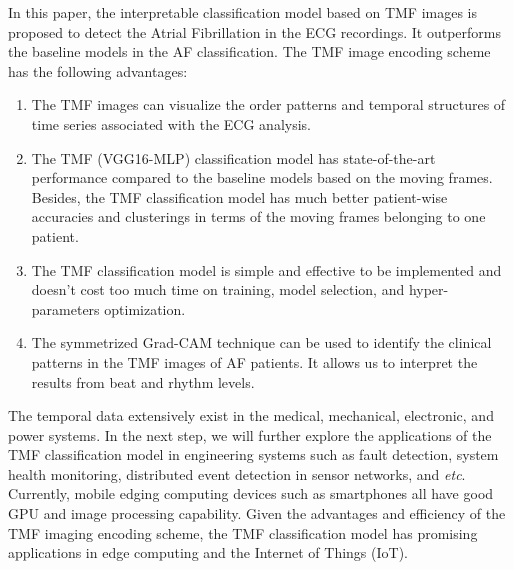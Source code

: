 \documentclass[journal]{IEEEtran}
\begin{document}
In this paper, the interpretable classification model based on TMF images is proposed to detect the Atrial Fibrillation in the ECG recordings. 
It outperforms the baseline models in the AF classification. The TMF image encoding scheme has the following advantages:
\begin{enumerate}
  \item The TMF images can visualize the order patterns and temporal structures of time series associated with the ECG analysis.
  \item The TMF (VGG16-MLP) classification model has state-of-the-art performance compared to the baseline models based on the moving frames. Besides, the TMF classification model has much better patient-wise accuracies and clusterings in terms of the moving frames belonging to one patient.  
  \item The TMF classification model is simple and effective to be implemented and doesn't cost too much time on training, model selection, and hyper-parameters optimization.
  \item The symmetrized Grad-CAM technique can be used to identify the clinical patterns in the TMF images of AF patients. It allows us to interpret the results from beat and rhythm levels. 
\end{enumerate}
The temporal data extensively exist in the medical, mechanical, electronic, and power systems. In the next step, we will further explore the applications of the TMF classification model in engineering systems such as fault detection, system health monitoring, distributed event detection in sensor networks, and {\it{etc}}. Currently, mobile edging computing devices such as smartphones all have good GPU and image processing capability. Given the advantages and efficiency of the TMF imaging encoding scheme, the TMF classification model has promising applications in edge computing and the Internet of Things (IoT). 





\end{document}
